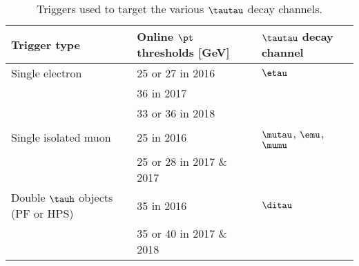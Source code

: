
\begin{table}[h]
\vspace{-1mm}
\centering
\caption{Triggers used to target the various $\tautau$ decay channels.}
\label{tab:triggers}
\begin{tabular}{lll}
  \hline
  Trigger type                       & Online $\pt$ thresholds [GeV] & $\tautau$ decay channel \\
  \hline
  Single electron                    & 25 or 27 in 2016 & $\etau$ \\
                                     & 36 in 2017       \\
                                     & 33 or 36 in 2018 \\[3pt]
  Single isolated muon               & 25 in 2016       & $\mutau$, $\emu$, $\mumu$ \\
                                     & 25 or 28 in 2017 \& 2017 \\[3pt]
  Double $\tauh$ objects (PF or HPS) & 35 in 2016       & $\ditau$ \\
                                     & 35 or 40 in 2017 \& 2018 \\
  \hline
\end{tabular}
\vspace{-1mm}
\end{table}

